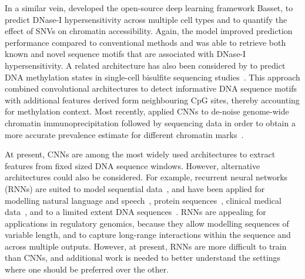 In a similar vein, \citet{kelley_basset:_2016} developed the open-source deep learning framework Basset, to predict DNase-I hypersensitivity across multiple cell types and to quantify the effect of SNVs on chromatin accessibility. Again, the model improved prediction performance compared to conventional methods and was able to retrieve both known and novel sequence motifs that are associated with DNase-I hypersensitivity. A related architecture has also been considered by \citet{angermueller_accurate_2017} to predict DNA methylation states in single-cell bisulfite sequencing studies~\citep{angermueller_accurate_2017}. This approach combined convolutional architectures to detect informative DNA sequence motifs with additional features derived form neighbouring CpG sites, thereby accounting for methylation context. Most recently, \citet{koh_denoising_2017} applied CNNs to de-noise genome-wide chromatin immunoprecipitation followed by sequencing data in order to obtain a more accurate prevalence estimate for different chromatin marks~\citep{koh_denoising_2017}.

At present, CNNs are among the most widely used architectures to extract features from fixed sized DNA sequence windows. However, alternative architectures could also be considered. For example, recurrent neural networks (RNNs) are suited to model sequential data~\citep{lipton_critical_2015}, and have been applied for modelling natural language and speech~\citep{che_distilling_2015,deng_deep_2015,graves_speech_2013,hinton_deep_2012,sutskever_sequence_2014,xiong_dynamic_2016}, protein sequences~\citep{agathocleous_protein_2010,sonderby_protein_2014}, clinical medical data~\citep{che_distilling_2015}, and to a limited extent DNA sequences~\citep{lee_dna-level_2015}. RNNs are appealing for applications in regulatory genomics, because they allow modelling sequences of variable length, and to capture long-range interactions within the sequence and across multiple outputs. However, at present, RNNs are more difficult to train than CNNs, and additional work is needed to better understand the settings where one should be preferred over the other.


